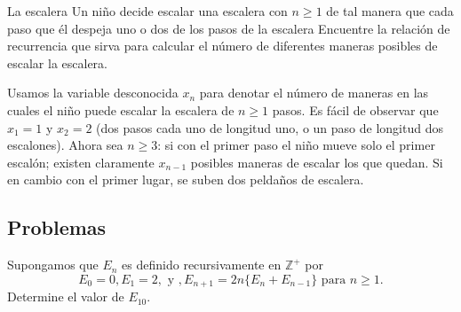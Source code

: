 \begin{example}{La escalera}
	Un niño decide escalar una escalera con $n\geq 1$ de tal manera que cada paso que él despeja uno o dos de los pasos de la escalera %
	Encuentre la relación de recurrencia que sirva para calcular el número de diferentes maneras posibles de escalar la escalera.
\end{example}
Usamos la variable desconocida $x_{n}$ para denotar el número de maneras en las cuales el niño puede escalar la escalera de $n\geq1$ pasos. Es fácil de observar que $x_{1}=1$ y $x_{2}=2$ (dos pasos cada uno de longitud uno, o un paso de longitud dos escalones). Ahora sea $n\geq3$: si con el primer paso el niño mueve solo el primer escalón; existen claramente $x_{n-1}$ posibles maneras de escalar los que quedan. Si en cambio con el primer lugar, se suben dos peldaños de escalera.
%
%
%
%
%
%
%
%
%

\subsection{Problemas}

\begin{exercise}
Supongamos que $E_n$ es definido recursivamente en $\mathds{Z}^+$ por \[ E_0=0,E_1=2,\text{ y },E_{n+1}=2n\{E_n+E_{n-1}\} \text{ para }n\geq 1. \] Determine el valor de $E_{10}$.
\end{exercise}

\begin{solution}

\end{solution}

